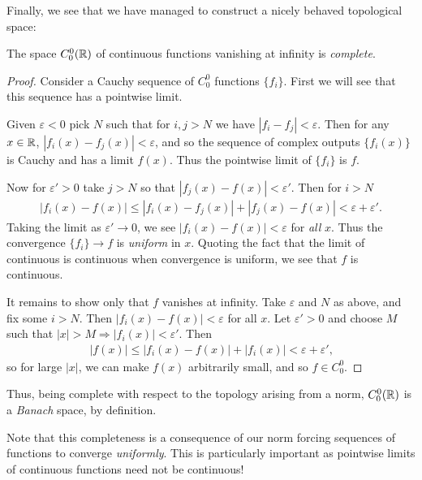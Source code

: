       Finally, we see that we have managed to construct a nicely behaved topological space:
      \begin{thm}
        \label{thm:c00complete}
        The space $C^0_0(\mathbb{R})$ of continuous functions vanishing at infinity is \emph{complete}.
      \end{thm}
      \begin{proof}
        Consider a Cauchy sequence of $C^0_0$ functions $\{f_i\}$.
        First we will see that this sequence has a pointwise limit.

        Given $\varepsilon<0$ pick $N$ such that for $i,j>N$ we have $|f_i-f_j|<\varepsilon$.
        Then for any $x\in\mathbb{R}$, $|f_i(x)-f_j(x)|<\varepsilon$, and so the sequence of complex outputs $\{f_i(x)\}$ is Cauchy and has a limit $f(x)$.
        Thus the pointwise limit of $\{f_i\}$ is $f$.
       
        Now for $\varepsilon'>0$ take $j>N$ so that $|f_j(x)-f(x)|<\varepsilon'$.
        Then for $i>N$
        \begin{align*}
          |f_i(x)-f(x)|\le|f_i(x)-f_j(x)|+|f_j(x)-f(x)|<\varepsilon+\varepsilon'\text{.}
        \end{align*}
        Taking the limit as $\varepsilon'\rightarrow0$, we see $|f_i(x)-f(x)|<\varepsilon$ for \emph{all} $x$.
        Thus the convergence $\{f_i\}\rightarrow f$ is \emph{uniform} in $x$.
        Quoting the fact that the limit of continuous is continuous when convergence is uniform, we see that $f$ is continuous.\footnotemark

        It remains to show only that $f$ vanishes at infinity.
        Take $\varepsilon$ and $N$ as above, and fix some $i>N$.
        Then $|f_i(x)-f(x)|<\varepsilon$ for all $x$.
        Let $\varepsilon'>0$ and choose $M$ such that $|x|>M\Rightarrow |f_i(x)|<\varepsilon'$.
        Then
        \begin{align*}
          |f(x)|\le|f_i(x)-f(x)|+|f_i(x)|<\varepsilon+\varepsilon'\text{,}
        \end{align*}
        so for large $|x|$, we can make $f(x)$ arbitrarily small, and so $f\in C^0_0$.
      \end{proof}
      \begin{rmk}
        Thus, being complete with respect to the topology arising from a norm, $C^0_0(\mathbb{R})$ is a \emph{Banach} space, by definition.
      \end{rmk}
      \begin{rmk}
        Note that this completeness is a consequence of our norm forcing sequences of functions to converge \emph{uniformly}.
        This is particularly important as pointwise limits of continuous functions need not be continuous!
      \end{rmk}

